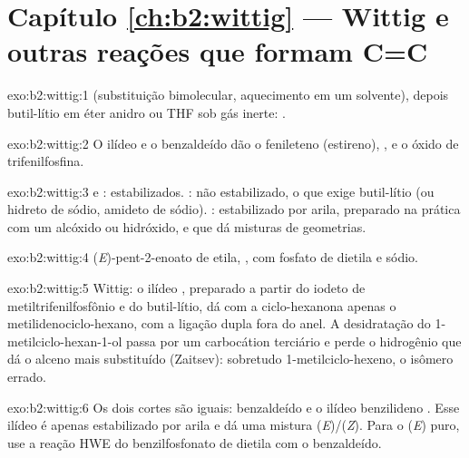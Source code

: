 \section*{Capítulo \ref{ch:b2:wittig} --- Wittig e outras reações que formam C=C}

\begin{solution}{exo:b2:wittig:1}
 (substituição bimolecular, aquecimento em um solvente), depois
butil-lítio em éter anidro ou THF sob gás inerte: .
\end{solution}

\begin{solution}{exo:b2:wittig:2}
O ilídeo  e o benzaldeído dão o fenileteno (estireno), , e o
óxido de trifenilfosfina.
\end{solution}

\begin{solution}{exo:b2:wittig:3}
 e : estabilizados. : não estabilizado, o que
exige butil-lítio (ou hidreto de sódio, amideto de sódio). : estabilizado por arila,
preparado na prática com um alcóxido ou hidróxido, e que dá misturas de geometrias.
\end{solution}

\begin{solution}{exo:b2:wittig:4}
(\textit{E})-pent-2-enoato de etila, , com fosfato de dietila e sódio.
\end{solution}

\begin{solution}{exo:b2:wittig:5}
Wittig: o ilídeo , preparado a partir do iodeto de metiltrifenilfosfônio e do butil-lítio,
dá com a ciclo-hexanona apenas o metilidenociclo-hexano, com a ligação dupla fora do anel. A
desidratação do 1-metilciclo-hexan-1-ol passa por um carbocátion terciário e perde o hidrogênio que
dá o alceno mais substituído (Zaitsev): sobretudo 1-metilciclo-hexeno, o isômero errado.
\end{solution}

\begin{solution}{exo:b2:wittig:6}
Os dois cortes são iguais: benzaldeído e o ilídeo benzilideno . Esse ilídeo é apenas
estabilizado por arila e dá uma mistura (\textit{E})/(\textit{Z}). Para o (\textit{E}) puro, use a
reação HWE do benzilfosfonato de dietila com o benzaldeído.
\end{solution}

